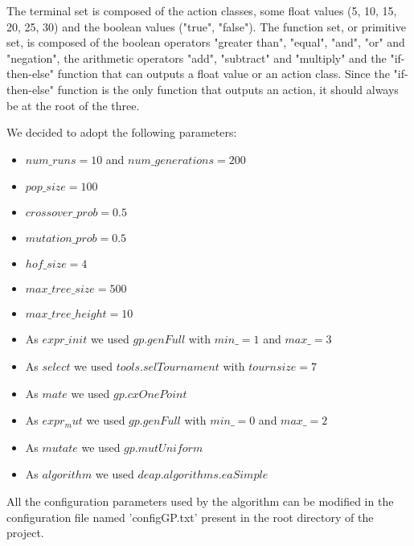 The terminal set is composed of the action classes, some float values (5, 10, 15, 20, 25, 30)
and the boolean values ("true", "false"). The function set, or primitive set, is composed of the
boolean operators "greater than", "equal", "and", "or" and "negation", the arithmetic operators
"add", "subtract" and "multiply" and the "if-then-else" function that can outputs a float value or
an action class. Since the "if-then-else" function is the only function that outputs an action, it
should always be at the root of the three.

We decided to adopt the following parameters:
\begin{itemize}
    \item $num\_runs = 10$ and $num\_generations = 200$
    \item $pop\_size = 100$
    \item $crossover\_prob = 0.5$
    \item $mutation\_prob = 0.5$
    \item $hof\_size = 4$
    \item $max\_tree\_size = 500$
    \item $max\_tree\_height = 10$
    \item As $expr\_init$ we used $gp.genFull$ with $min\_ = 1$ and $max\_ = 3$
    \item As $select$ we used $tools.selTournament$ with $tournsize = 7$
    \item As $mate$ we used $gp.cxOnePoint$
    \item As $expr_mut$ we used $gp.genFull$ with $min\_ = 0$ and $max\_ = 2$
    \item As $mutate$ we used $gp.mutUniform$
    \item As $algorithm$ we used $deap.algorithms.eaSimple$
    
\end{itemize}

All the configuration parameters used by the algorithm can be modified in the configuration
file named 'configGP.txt' present in the root directory of the project.

    